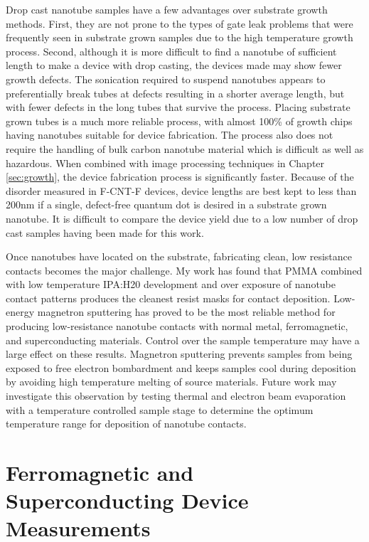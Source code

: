 Drop cast nanotube samples have a few advantages over substrate growth methods. First, they are not prone to the types of gate leak problems that were frequently seen in substrate grown samples due to the high temperature growth process. Second, although it is more difficult to find a nanotube of sufficient length to make a device with drop casting, the devices made may show fewer growth defects. The sonication required to suspend nanotubes appears to preferentially break tubes at defects resulting in a shorter average length, but with fewer defects in the long tubes that survive the process. Placing substrate grown tubes is a much more reliable process, with almost 100\% of growth chips having nanotubes suitable for device fabrication. The process also does not require the handling of bulk carbon nanotube material which is difficult as well as hazardous. When combined with image processing techniques in Chapter \ref{sec:growth}, the device fabrication process is significantly faster. Because of the disorder measured in F-CNT-F devices, device lengths are best kept to less than 200nm if a single, defect-free quantum dot is desired in a substrate grown nanotube. It is difficult to compare the device yield due to a low number of drop cast samples having been made for this work.

Once nanotubes have located on the substrate, fabricating clean, low resistance contacts becomes the major challenge. My work has found that PMMA combined with low temperature IPA:H20 development and over exposure of nanotube contact patterns produces the cleanest resist masks for contact deposition. Low-energy magnetron sputtering has proved to be the most reliable method for producing low-resistance nanotube contacts with normal metal, ferromagnetic, and superconducting materials. Control over the sample temperature may have a large effect on these results. Magnetron sputtering prevents samples from being exposed to free electron bombardment and keeps samples cool during deposition by avoiding high temperature melting of source materials. Future work may investigate this observation by testing thermal and electron beam evaporation with a temperature controlled sample stage to determine the optimum temperature range for deposition of nanotube contacts.

\section{Ferromagnetic and Superconducting Device Measurements}

